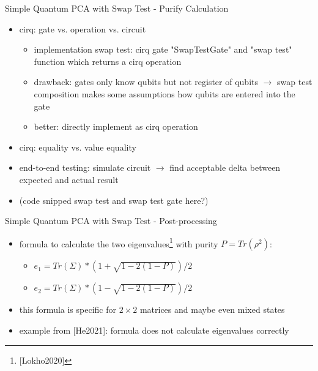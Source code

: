 \begin{frame}{Simple Quantum PCA with Swap Test - Purify Calculation}
  \begin{minipage}{0.5\textwidth}
    \begin{itemize}
      \item cirq: gate vs. operation vs. circuit
      \begin{itemize}
        \item implementation swap test: cirq gate "SwapTestGate" and "swap test" function which returns a cirq operation
        \item drawback: gates only know qubits but not register of qubits $\rightarrow$ swap test composition makes some assumptions how qubits are entered into the gate
        \item better: directly implement as cirq operation
      \end{itemize}
      \item cirq: equality vs. value equality
      \item end-to-end testing: simulate circuit $\rightarrow$ find acceptable delta between expected and actual result
    \end{itemize}
  \end{minipage}%
  \begin{minipage}{0.5\textwidth}
    \begin{itemize}
      \item (code snipped swap test and swap test gate here?)
    \end{itemize}
  \end{minipage}
\end{frame}


\begin{frame}{Simple Quantum PCA with Swap Test - Post-processing}
  \begin{minipage}{1.0\textwidth}
    \begin{itemize}
      \item formula to calculate the two eigenvalues\footnote{[Lokho2020]} with purity $P = Tr(\rho^2)$:
      \begin{itemize}
        \item $e_1 = Tr(\Sigma) \ast (1 + \sqrt{1 - 2 (1 - P)}) / 2$
        \item $e_2 = Tr(\Sigma) \ast (1 - \sqrt{1 - 2 (1 - P)}) / 2$
      \end{itemize}
      \item this formula is specific for $2 \times 2$ matrices and maybe even mixed states
      \item example from [He2021]: formula does not calculate eigenvalues correctly 
    \end{itemize}
  \end{minipage}
\end{frame}


